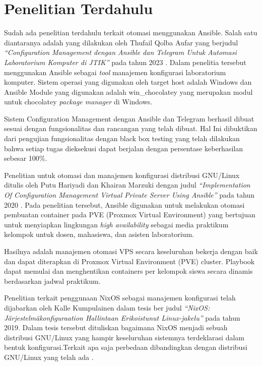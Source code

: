 \documentclass[10pt,]{report}
\begin{document}
\section{Penelitian Terdahulu}
\begin{adjustwidth}{0.70cm}{}
	\vspace{-3mm}
	\hspace\parindent
	Sudah ada penelitian terdahulu terkait otomasi menggunakan Ansible. Salah
	satu diantaranya adalah yang dilakukan oleh Thufail Qolba Aufar yang
	berjudul \textit{“Configuration Management dengan Ansible dan Telegram Untuk
		Automasi Laboratorium Komputer di JTIK”} pada tahun 2023 \parencite{thufail23}. Dalam penelitia
	tersebut menggunakan Ansible sebagai \textit{tool} manajemen konfigurasi
	laboratorium komputer. Sistem operasi yang digunakan oleh target host
	adalah Windows dan Ansible Module yang digunakan adalah win\_chocolatey yang
	merupakan modul untuk chocolatey \textit{package manager} di Windows.

	Sistem Configuration Management dengan Ansible dan Telegram berhasil dibuat
	sesuai dengan fungsionalitas dan rancangan yang telah dibuat. Hal Ini
	dibuktikan dari pengujian fungsionalitas dengan black box testing yang telah
	dilakukan bahwa setiap tugas dieksekusi dapat berjalan dengan persentase
	keberhasilan sebesar 100\%.

	Penelitian untuk otomasi dan manajemen konfigurasi distribusi GNU/Linux
	ditulis oleh Putu Hariyadi dan Khairan Marzuki dengan judul \textit{“Implementation
		Of Configuration Management Virtual Private Server Using Ansible”} pada
	tahun 2020 \parencite{hariyadi2020}. Pada penelitian tersebut, Ansible digunakan untuk melakukan
	otomasi pembuatan container pada PVE (Proxmox Virtual Environment) yang
	bertujuan untuk menyiapkan lingkungan \textit{high availability} sebagai media
	praktikum kelompok untuk dosen, mahasiswa, dan asisten laboratorium.

	Hasilnya adalah manajemen otomasi VPS secara keseluruhan bekerja dengan baik
	dan dapat diterapkan di Proxmox Virtual Environment (PVE) cluster. Playbook
	dapat memulai dan menghentikan containers per kelompok siswa secara dinamis
	berdasarkan jadwal praktikum.

	Penelitian terkait penggunaan NixOS sebagai manajemen konfigurasi telah
	dijabarkan oleh Kalle Kumpulainen dalam tesis ber judul \textit{“NixOS:
		Järjestelmäkonfiguraation Hallintaan Erikoistunut Linux-jakelu”} pada tahun
	2019. Dalam tesis tersebut dituliskan bagaimana NixOS menjadi sebuah
	distribusi GNU/Linux yang hampir keseluruhan sistemnya terdeklarasi dalam
	bentuk konfigurasi.Terkait apa saja perbedaan dibandingkan dengan
	distribusi GNU/Linux yang telah ada \parencite{kumpulainen_2019_nixos}.


\end{adjustwidth}
\end{document}
